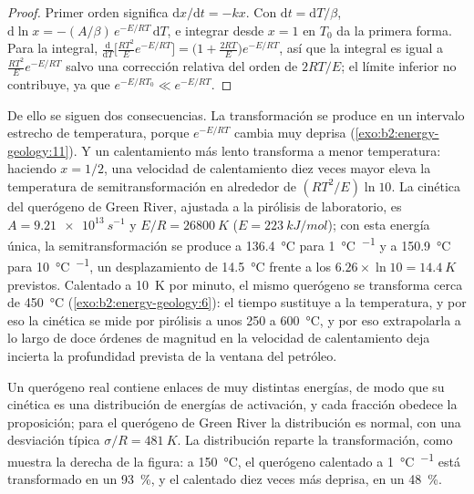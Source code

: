 \begin{proof}
Primer orden significa $\mathrm{d}x/\mathrm{d}t = -k x$. Con $\mathrm{d}t = \mathrm{d}T/\beta$,
$\mathrm{d}\ln x = -(A/\beta)\,e^{-E/RT}\,\mathrm{d}T$, e integrar desde $x = 1$ en $T_0$ da
la primera forma. Para la integral, $\frac{\mathrm{d}}{\mathrm{d}T}\bigl[\frac{RT^2}{E}e^{-E/RT}\bigr]
= \bigl(1 + \frac{2RT}{E}\bigr)e^{-E/RT}$, así que la integral es igual a $\frac{RT^2}{E}e^{-E/RT}$ salvo una
corrección relativa del orden de $2RT/E$; el límite inferior no contribuye, ya que $e^{-E/RT_0} \ll
e^{-E/RT}$.
\end{proof}

De ello se siguen dos consecuencias. La transformación se produce en un intervalo estrecho de temperatura, porque
$e^{-E/RT}$ cambia muy deprisa (\cref{exo:b2:energy-geology:11}). Y un calentamiento más lento transforma
a menor temperatura: haciendo $x = 1/2$, una velocidad de calentamiento diez veces mayor eleva la temperatura de
semitransformación en alrededor de $(RT^2/E)\ln 10$. La cinética del querógeno de Green River, ajustada a la
pirólisis de laboratorio, es $A = \qty{9.21e13}{s^{-1}}$ y $E/R = \qty{26800}{K}$ ($E =
\qty{223}{kJ/mol}$); con esta energía única, la semitransformación se produce a \qty{136.4}{\celsius} para
\qty{1}{\celsius\per\Myr} y a \qty{150.9}{\celsius} para \qty{10}{\celsius\per\Myr}, un desplazamiento de
\qty{14.5}{\celsius} frente a los $6.26 \times \ln 10 = \qty{14.4}{K}$ previstos. Calentado a
\qty{10}{K} por minuto, el mismo querógeno se transforma cerca de \qty{450}{\celsius}
(\cref{exo:b2:energy-geology:6}): el tiempo sustituye a la temperatura, y por eso la cinética se
mide por pirólisis a unos 250 a \qty{600}{\celsius}, y por eso extrapolarla a lo largo de doce
órdenes de magnitud en la velocidad de calentamiento deja incierta la profundidad prevista de la ventana del petróleo.

Un querógeno real contiene enlaces de muy distintas energías, de modo que su cinética es una distribución de energías de
activación, y cada fracción obedece la proposición; para el querógeno de Green River la distribución es
normal, con una desviación típica $\sigma/R = \qty{481}{K}$. La distribución reparte la
transformación, como muestra la derecha de la figura: a \qty{150}{\celsius}, el querógeno calentado a
\qty{1}{\celsius\per\Myr} está transformado en un \qty{93}{\percent}, y el calentado diez veces más deprisa, en un
\qty{48}{\percent}.

